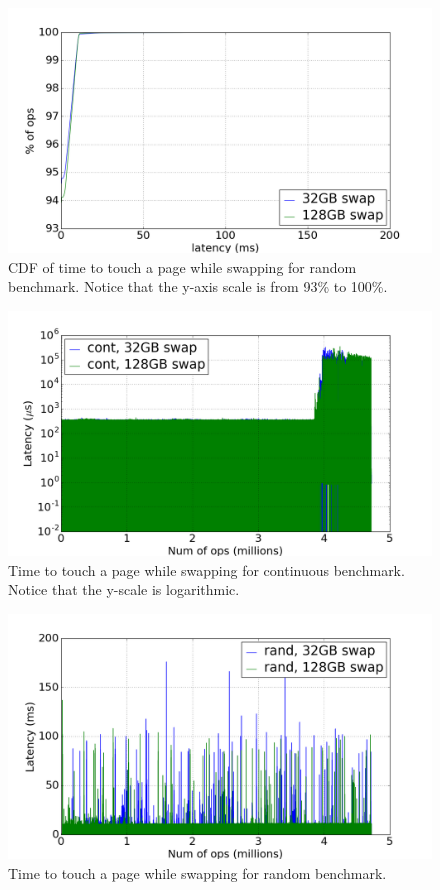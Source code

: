 \documentclass[twocolumn,11pt]{article}
\begin{document}
\begin{figure}[t]
    \includegraphics[width=\columnwidth]{figures/swap_touch_time_rand_cdf}
    \caption{CDF of time to touch a page while swapping for random benchmark.
    Notice that the y-axis scale is from 93\% to 100\%.\label{fig:swap_time_rand_cdf}}
\end{figure}

\begin{figure}[t]
    \includegraphics[width=\columnwidth]{figures/swap_time_cont}
    \caption{Time to touch a page while swapping for continuous benchmark.
    Notice that the y-scale is logarithmic.\label{fig:swap_time_cont}}
\end{figure}

\begin{figure}[t]
    \includegraphics[width=\columnwidth]{figures/swap_time_rand}
    \caption{Time to touch a page while swapping for random
    benchmark.\label{fig:swap_time_rand}}
\end{figure}
\end{document}
